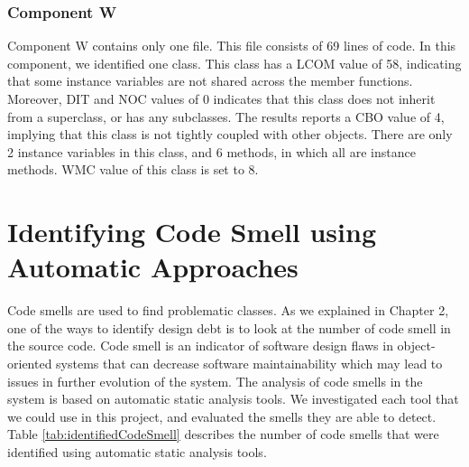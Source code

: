  



\subsubsection{Component W}
Component W contains only one file. This file consists of 69 lines of code. In this component, we identified one class. This class has a LCOM value of 58, indicating that some instance variables are not shared across the member functions. Moreover, DIT and NOC values of 0 indicates that this class does not inherit from a superclass, or has any subclasses. The results reports a CBO value of 4, implying that this class is not tightly coupled with other objects. There are only 2 instance variables in this class, and 6 methods, in which all are instance methods. WMC value of this class is set to 8.































\section{Identifying Code Smell using Automatic Approaches}
\label{sub:code_smell_detection}
Code smells are used to find problematic classes. As we explained in Chapter 2, one of the ways to identify design debt is to look at the number of code smell in the source code. Code smell is an indicator of software design flaws in object-oriented systems that can decrease software maintainability which may lead to issues in further evolution of the system\cite{olbrich2009evolution}. The analysis of code smells in the system is based on automatic static analysis tools. We investigated each tool that we could use in this project, and evaluated the smells they are able to detect. Table \ref{tab:identifiedCodeSmell} describes the number of code smells that were identified using automatic static analysis tools.

